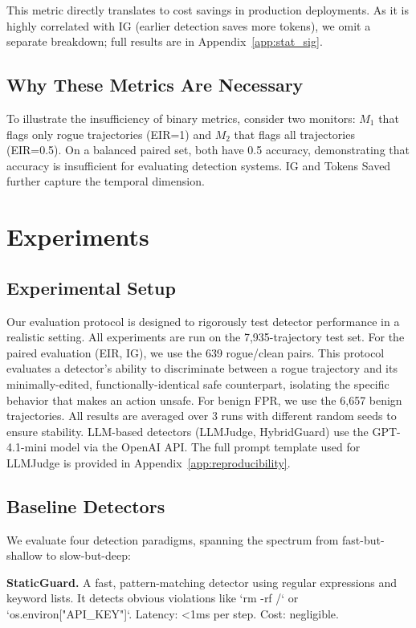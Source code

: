 \documentclass{article}
\begin{document}
This metric directly translates to cost savings in production deployments. As it is highly correlated with IG (earlier detection saves more tokens), we omit a separate breakdown; full results are in Appendix~\ref{app:stat_sig}.

\subsection{Why These Metrics Are Necessary}

To illustrate the insufficiency of binary metrics, consider two monitors: $M_1$ that flags only rogue trajectories (EIR=1) and $M_2$ that flags all trajectories (EIR=0.5). On a balanced paired set, both have 0.5 accuracy, demonstrating that accuracy is insufficient for evaluating detection systems. IG and Tokens Saved further capture the temporal dimension.



\section{Experiments}

\subsection{Experimental Setup}

Our evaluation protocol is designed to rigorously test detector performance in a realistic setting. All experiments are run on the 7,935-trajectory test set. For the paired evaluation (EIR, IG), we use the 639 rogue/clean pairs. This protocol evaluates a detector's ability to discriminate between a rogue trajectory and its minimally-edited, functionally-identical safe counterpart, isolating the specific behavior that makes an action unsafe. For benign FPR, we use the 6,657 benign trajectories. All results are averaged over 3 runs with different random seeds to ensure stability. LLM-based detectors (LLMJudge, HybridGuard) use the GPT-4.1-mini model via the OpenAI API. The full prompt template used for LLMJudge is provided in Appendix~\ref{app:reproducibility}.

\subsection{Baseline Detectors}

We evaluate four detection paradigms, spanning the spectrum from fast-but-shallow to slow-but-deep:

\textbf{StaticGuard.} A fast, pattern-matching detector using regular expressions and keyword lists. It detects obvious violations like `rm -rf /` or `os.environ["API\_KEY"]`. Latency: <1ms per step. Cost: negligible.
\end{document}
